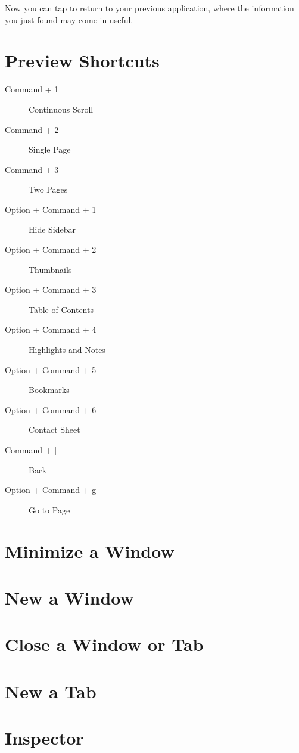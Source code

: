Now you can tap  to return to your previous application, where the information you just found may come in useful.


\section{Preview Shortcuts}

\begin{description}
\item[Command + 1] Continuous Scroll
\item[Command + 2] Single Page
\item[Command + 3] Two Pages
\item[Option + Command + 1] Hide Sidebar
\item[Option + Command + 2] Thumbnails
\item[Option + Command + 3] Table of Contents
\item[Option + Command + 4] Highlights and Notes
\item[Option + Command + 5] Bookmarks
\item[Option + Command + 6] Contact Sheet
\item[Command + [] Back
\item[Option + Command + g] Go to Page
\end{description}

\section{Minimize a Window}


\section{New a Window}


\section{Close a Window or Tab}


\section{New a Tab}


\section{Inspector}

